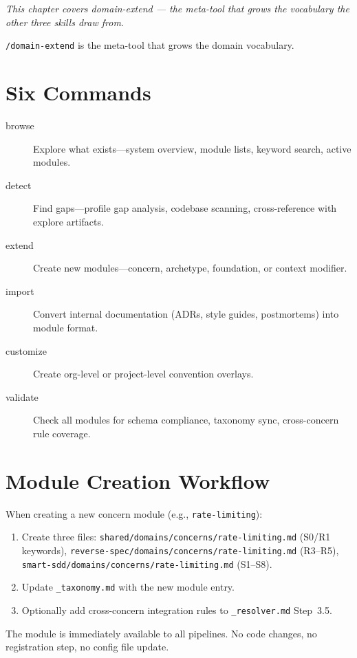 \documentclass[11pt,a4paper,openright,twoside]{report}
\newcommand{\cmd}[1]{\texttt{/#1}}
\newcommand{\file}[1]{\texttt{#1}}
\begin{document}
\textit{This chapter covers domain-extend --- the meta-tool that grows the vocabulary the other three skills draw from.}

\cmd{domain-extend} is the meta-tool that grows the domain vocabulary.

\section{Six Commands}

\begin{description}
  \item[browse] Explore what exists---system overview, module lists, keyword search, active modules.
  \item[detect] Find gaps---profile gap analysis, codebase scanning, cross-reference with explore artifacts.
  \item[extend] Create new modules---concern, archetype, foundation, or context modifier.
  \item[import] Convert internal documentation (ADRs, style guides, postmortems) into module format.
  \item[customize] Create org-level or project-level convention overlays.
  \item[validate] Check all modules for schema compliance, taxonomy sync, cross-concern rule coverage.
\end{description}

\section{Module Creation Workflow}

When creating a new concern module (e.g., \texttt{rate-limiting}):

\begin{enumerate}
  \item Create three files: \file{shared/domains/concerns/rate-limiting.md} (S0/R1 keywords), \file{reverse-spec/domains/concerns/rate-limiting.md} (R3--R5), \file{smart-sdd/domains/concerns/rate-limiting.md} (S1--S8).
  \item Update \file{\_taxonomy.md} with the new module entry.
  \item Optionally add cross-concern integration rules to \file{\_resolver.md} Step~3.5.
\end{enumerate}

The module is immediately available to all pipelines. No code changes, no registration step, no config file update.
\end{document}
